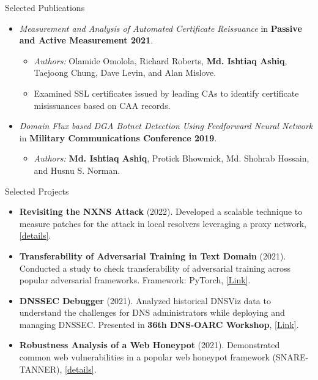\documentclass[]{mcdowellcv}
\begin{document}
\begin{cvsection}{Selected Publications}
\begin{cvsubsection}{}{}{}
\begin{itemize}
\begin{itemize}
				\end{itemize}
				\item \textit{Measurement and Analysis of Automated Certificate Reissuance} in \textbf{Passive and Active Measurement 2021}.
				\begin{itemize}
					\item \textit{Authors:} Olamide Omolola, Richard Roberts, \textbf{Md. Ishtiaq Ashiq}, Taejoong Chung, Dave Levin, and Alan Mislove.  %
					\item Examined SSL certificates issued by leading CAs to identify certificate misissuances based on CAA records.
				\end{itemize}
				\item \textit{Domain Flux based DGA Botnet Detection Using Feedforward Neural Network} in \textbf{Military Communications Conference 2019}.
				\begin{itemize}
					\item \textit{Authors:} \textbf{Md. Ishtiaq Ashiq}, Protick Bhowmick, Md. Shohrab Hossain, and Husnu S. Norman.  %
				\end{itemize}
			\end{itemize}
		\end{cvsubsection}
	\end{cvsection}

	\begin{cvsection}{Selected Projects}
		\begin{cvsubsection}{}{}{}
			\begin{itemize}
				\item \textbf{Revisiting the NXNS Attack} (2022). Developed a scalable technique to measure patches for the attack in local resolvers leveraging a proxy network, \href{https://drive.google.com/file/d/1kuTSIHuNUYxmIKbR6MsSg3znMqx55mCP/view}{[details]}.
				\item \textbf{Transferability of Adversarial Training in Text Domain} (2021). Conducted a study to check transferability of adversarial training across popular adversarial frameworks. Framework: PyTorch, \href{https://github.com/Ashiq5/AdvTrainingExperiment}{[Link]}.
				\item \textbf{DNSSEC Debugger} (2021). Analyzed historical DNSViz data to understand the challenges for DNS administrators while deploying and managing DNSSEC. Presented in \textbf{36th DNS-OARC Workshop}, \href{https://indico.dns-oarc.net/event/40/contributions/891/attachments/857/1555/DNS-OARC-final.pdf}{[Link]}.
				\item \textbf{Robustness Analysis of a Web Honeypot} (2021). Demonstrated common web vulnerabilities in a popular web honeypot framework (SNARE-TANNER), \href{https://drive.google.com/file/d/1-FuDy-8xTE2TCRVV2RDuusnhAiLdgMeO/view?usp=sharing}{[details]}.
			\end{itemize}
		\end{cvsubsection}
	\end{cvsection}
\end{document}
